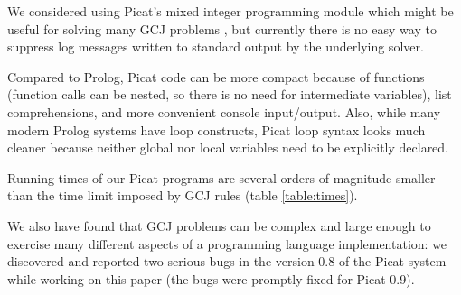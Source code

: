 \documentclass{llncs}
\begin{document}
We considered using Picat's mixed integer programming module which might be useful for solving many GCJ problems \cite{gcj-eclipse-arxiv},
but currently there is no easy way to suppress log messages written to standard output by the underlying solver.

Compared to Prolog, Picat code can be more compact because of functions (function calls can be nested,
so there is no need for intermediate variables), list comprehensions, and more convenient console input/output.
Also, while many modern Prolog systems have loop constructs,
Picat loop syntax looks much cleaner because neither global nor local variables need to be explicitly declared.

Running times of our Picat programs are several orders of magnitude smaller than the time limit imposed by GCJ rules (table \ref{table:times}).

We also have found that GCJ problems can be complex and large enough to exercise many different aspects of a programming language implementation:
we discovered and reported two serious bugs in the version 0.8 of the Picat system while working on this paper (the bugs were promptly fixed for Picat 0.9).





\end{document}

